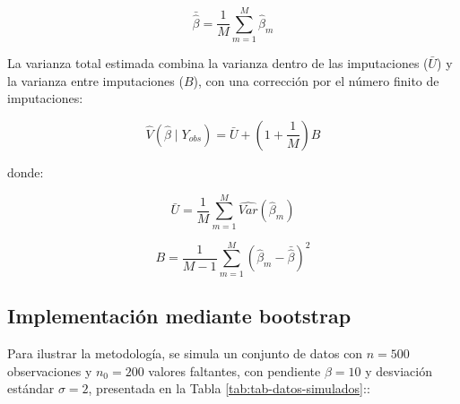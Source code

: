 \documentclass[
  spanish,
  12pt,
]{book}
\newenvironment{Shaded}{\begin{snugshade}}{\end{snugshade}}
\newcommand{\AttributeTok}[1]{\textcolor[rgb]{0.13,0.29,0.53}{#1}}
\newcommand{\ConstantTok}[1]{\textcolor[rgb]{0.56,0.35,0.01}{#1}}
\newcommand{\ControlFlowTok}[1]{\textcolor[rgb]{0.13,0.29,0.53}{\textbf{#1}}}
\newcommand{\DecValTok}[1]{\textcolor[rgb]{0.00,0.00,0.81}{#1}}
\newcommand{\FunctionTok}[1]{\textcolor[rgb]{0.13,0.29,0.53}{\textbf{#1}}}
\newcommand{\NormalTok}[1]{#1}
\newcommand{\OtherTok}[1]{\textcolor[rgb]{0.56,0.35,0.01}{#1}}
\newcommand{\SpecialCharTok}[1]{\textcolor[rgb]{0.81,0.36,0.00}{\textbf{#1}}}
\newcommand{\StringTok}[1]{\textcolor[rgb]{0.31,0.60,0.02}{#1}}
\begin{document}
\[\bar{\hat{\beta}} = \frac{1}{M} \sum_{m=1}^{M} \hat{\beta}_m\]

La varianza total estimada combina la varianza dentro de las imputaciones (\(\bar{U}\)) y la varianza entre imputaciones (\(B\)), con una corrección por el número finito de imputaciones:

\[\hat{V}(\hat{\beta} \mid Y_{obs}) = \bar{U} + \left(1 + \frac{1}{M}\right) B\]

donde:

\[\bar{U} = \frac{1}{M} \sum_{m=1}^{M} \widehat{Var}(\hat{\beta}_m)\]

\[B = \frac{1}{M-1} \sum_{m=1}^{M} \left(\hat{\beta}_m - \bar{\hat{\beta}}\right)^2\]

\subsection{Implementación mediante bootstrap}\label{implementaciuxf3n-mediante-bootstrap}

Para ilustrar la metodología, se simula un conjunto de datos con \(n = 500\) observaciones y \(n_0 = 200\) valores faltantes, con pendiente \(\beta = 10\) y desviación estándar \(\sigma = 2\), presentada en la Tabla \ref{tab:tab-datos-simulados}::

\begin{Shaded}
\end{Shaded}
\end{document}
